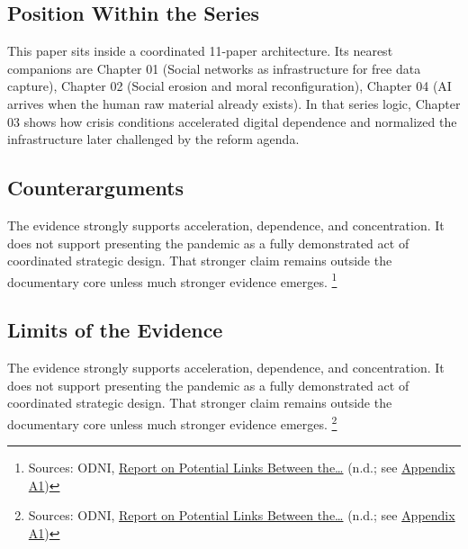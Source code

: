 \documentclass[
  american,
  11pt,
  letterpaper,
]{article}
\begin{document}
\subsection{Position Within the
Series}\label{position-within-the-series-3}

This paper sits inside a coordinated 11-paper architecture. Its nearest
companions are Chapter 01 (Social networks as infrastructure for free
data capture), Chapter 02 (Social erosion and moral reconfiguration),
Chapter 04 (AI arrives when the human raw material already exists). In
that series logic, Chapter 03 shows how crisis conditions accelerated
digital dependence and normalized the infrastructure later challenged by
the reform agenda.

\subsection{Counterarguments}\label{counterarguments-3}

The evidence strongly supports acceleration, dependence, and
concentration. It does not support presenting the pandemic as a fully
demonstrated act of coordinated strategic design. That stronger claim
remains outside the documentary core unless much stronger evidence
emerges. \footnote{Sources: ODNI,
  \href{https://www.dni.gov/files/ODNI/documents/assessments/Report-on-Potential-Links-Between-the-Wuhan-Institute-of-Virology-and-the-Origins-of-COVID-19-20230623.pdf}{Report
  on Potential Links Between the\ldots{}} (n.d.; see
  \hyperref[ch-03-appendix-a1-report-on-potential-links-between-the-wuhan-institute-of-virology-and-the-origins-of-covid-19]{Appendix
  A1})}

\subsection{Limits of the Evidence}\label{limits-of-the-evidence-3}

The evidence strongly supports acceleration, dependence, and
concentration. It does not support presenting the pandemic as a fully
demonstrated act of coordinated strategic design. That stronger claim
remains outside the documentary core unless much stronger evidence
emerges. \footnote{Sources: ODNI,
  \href{https://www.dni.gov/files/ODNI/documents/assessments/Report-on-Potential-Links-Between-the-Wuhan-Institute-of-Virology-and-the-Origins-of-COVID-19-20230623.pdf}{Report
  on Potential Links Between the\ldots{}} (n.d.; see
  \hyperref[ch-03-appendix-a1-report-on-potential-links-between-the-wuhan-institute-of-virology-and-the-origins-of-covid-19]{Appendix
  A1})}
\end{document}
